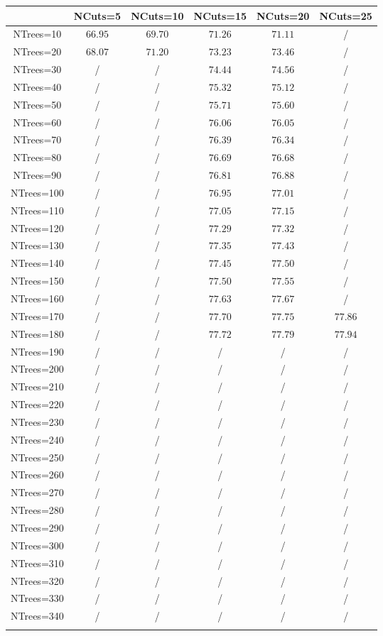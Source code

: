 \centering
\begin{tabular}{cccccc} \toprule\toprule
 & NCuts=5 & NCuts=10 & NCuts=15 & NCuts=20 & NCuts=25\\\midrule
NTrees=10 & $66.95$ & $69.70$ & $71.26$ & $71.11$ &  /\\
NTrees=20 & $68.07$ & $71.20$ & $73.23$ & $73.46$ &  /\\
NTrees=30 &  / &  / & $74.44$ & $74.56$ &  /\\
NTrees=40 &  / &  / & $75.32$ & $75.12$ &  /\\
NTrees=50 &  / &  / & $75.71$ & $75.60$ &  /\\
NTrees=60 &  / &  / & $76.06$ & $76.05$ &  /\\
NTrees=70 &  / &  / & $76.39$ & $76.34$ &  /\\
NTrees=80 &  / &  / & $76.69$ & $76.68$ &  /\\
NTrees=90 &  / &  / & $76.81$ & $76.88$ &  /\\
NTrees=100 &  / &  / & $76.95$ & $77.01$ &  /\\
NTrees=110 &  / &  / & $77.05$ & $77.15$ &  /\\
NTrees=120 &  / &  / & $77.29$ & $77.32$ &  /\\
NTrees=130 &  / &  / & $77.35$ & $77.43$ &  /\\
NTrees=140 &  / &  / & $77.45$ & $77.50$ &  /\\
NTrees=150 &  / &  / & $77.50$ & $77.55$ &  /\\
NTrees=160 &  / &  / & $77.63$ & $77.67$ &  /\\
NTrees=170 &  / &  / & $77.70$ & $77.75$ & $77.86$\\
NTrees=180 &  / &  / & $77.72$ & $77.79$ & $77.94$\\
NTrees=190 &  / &  / &  / &  / &  /\\
NTrees=200 &  / &  / &  / &  / &  /\\
NTrees=210 &  / &  / &  / &  / &  /\\
NTrees=220 &  / &  / &  / &  / &  /\\
NTrees=230 &  / &  / &  / &  / &  /\\
NTrees=240 &  / &  / &  / &  / &  /\\
NTrees=250 &  / &  / &  / &  / &  /\\
NTrees=260 &  / &  / &  / &  / &  /\\
NTrees=270 &  / &  / &  / &  / &  /\\
NTrees=280 &  / &  / &  / &  / &  /\\
NTrees=290 &  / &  / &  / &  / &  /\\
NTrees=300 &  / &  / &  / &  / &  /\\
NTrees=310 &  / &  / &  / &  / &  /\\
NTrees=320 &  / &  / &  / &  / &  /\\
NTrees=330 &  / &  / &  / &  / &  /\\
NTrees=340 &  / &  / &  / &  / &  /\\
\bottomrule\bottomrule\\
\end{tabular}
